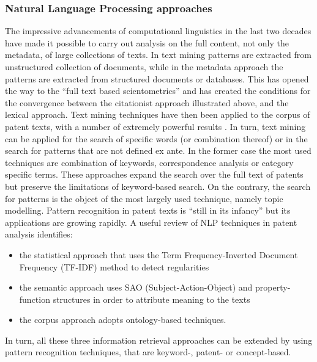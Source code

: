 \documentclass[]{book}
\providecommand{\tightlist}{%
  \setlength{\itemsep}{0pt}\setlength{\parskip}{0pt}}
\begin{document}
\subsubsection{Natural Language Processing
approaches}\label{natural-language-processing-approaches}

The impressive advancements of computational linguistics in the last two
decades have made it possible to carry out analysis on the full content,
not only the metadata, of large collections of texts. In text mining
patterns are extracted from unstructured collection of documents, while
in the metadata approach the patterns are extracted from structured
documents or databases. This has opened the way to the ``full text based
scientometrics'' \citep{boyack2013improving} and has created the
conditions for the convergence between the citationist approach
illustrated above, and the lexical approach. Text mining techniques have
then been applied to the corpus of patent texts, with a number of
extremely powerful results
\citetext{\citealp[\citet{joung2017monitoring},
\citet{kreuchauff2017patent},
\citet{ozcan2017patent}]{tseng2007text}; \citealp{yoon2012detecting}}.
In turn, text mining can be applied for the search of specific words (or
combination thereof) or in the search for patterns that are not defined
ex ante. In the former case the most used techniques are combination of
keywords, correspondence analysis or category specific terms. These
approaches expand the search over the full text of patents but preserve
the limitations of keyword-based search. On the contrary, the search for
patterns is the object of the most largely used technique, namely topic
modelling. Pattern recognition in patent texts is ``still in its
infancy'' \citep{madani2016evolution} but its applications are growing
rapidly. A useful review of NLP techniques in patent analysis
\citep{madani2016evolution} identifies:

\begin{itemize}
\tightlist
\item
  the statistical approach that uses the Term Frequency-Inverted
  Document Frequency (TF-IDF) method to detect regularities
\item
  the semantic approach uses SAO (Subject-Action-Object) and
  property-function structures in order to attribute meaning to the
  texts
\item
  the corpus approach adopts ontology-based techniques.
\end{itemize}

In turn, all these three information retrieval approaches can be
extended by using pattern recognition techniques, that are keyword-,
patent- or concept-based.
\end{document}
